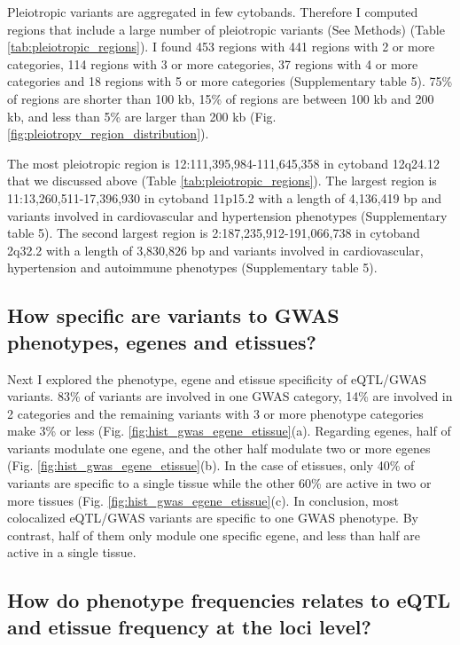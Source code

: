 Pleiotropic variants are aggregated in few cytobands.
%
Therefore I computed regions that include a large number of pleiotropic variants (See Methods) (Table \ref{tab:pleiotropic_regions}).
%
I found 453 regions with 441 regions with 2 or more categories, 114 regions with 3 or more categories, 37 regions with 4 or more categories and 18 regions with 5 or more categories (Supplementary table 5).
%
75\% of regions are shorter than 100 kb, 15\% of regions are between 100 kb and 200 kb, and less than 5\% are larger than 200 kb (Fig. \ref{fig:pleiotropy_region_distribution}).

The most pleiotropic region is 12:111,395,984-111,645,358 in cytoband 12q24.12 that we discussed above (Table \ref{tab:pleiotropic_regions}).
%
The largest region is 11:13,260,511-17,396,930 in cytoband 11p15.2 with a length of 4,136,419 bp and variants involved in cardiovascular and hypertension phenotypes (Supplementary table 5).
%
The second largest region is 2:187,235,912-191,066,738 in cytoband 2q32.2 with a length of 3,830,826 bp and variants involved in cardiovascular, hypertension and autoimmune phenotypes  (Supplementary table 5).

\subsection*{How specific are variants to GWAS phenotypes, egenes and etissues?}

Next I explored the phenotype, egene and etissue specificity of eQTL/GWAS variants.
%
83\% of variants are involved in one GWAS category, 14\% are involved in 2 categories and the remaining variants with 3 or more phenotype categories make 3\% or less (Fig. \ref{fig:hist_gwas_egene_etissue}(a).
%
Regarding egenes, half of variants modulate one egene, and the other half modulate two or more egenes (Fig. \ref{fig:hist_gwas_egene_etissue}(b).
%
In the case of etissues, only 40\% of variants are specific to a single tissue while the other 60\% are active in two or more tissues (Fig. \ref{fig:hist_gwas_egene_etissue}(c).
%
In conclusion, most colocalized eQTL/GWAS variants are specific to one GWAS phenotype. By contrast, half of them only module one specific egene, and less than half are active in a single tissue.

\subsection*{How do phenotype frequencies relates to eQTL and etissue frequency at the loci level?}

